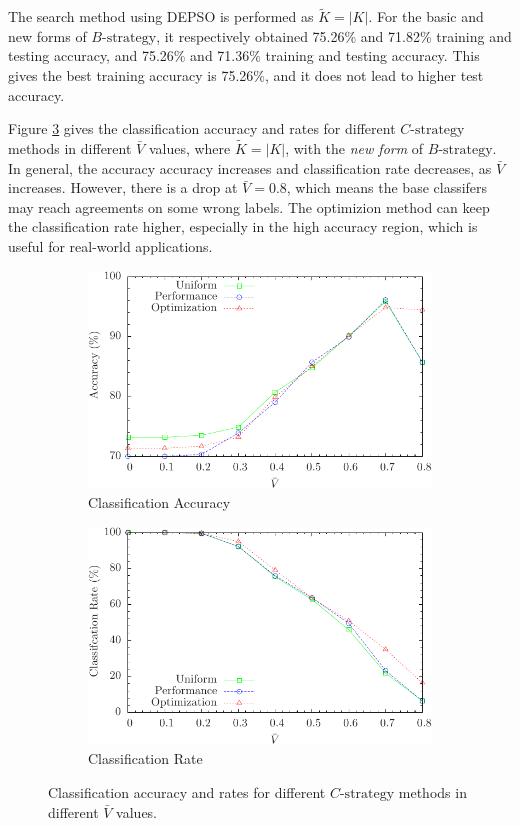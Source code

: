 The search method using DEPSO is performed as $\tilde{K}=|K|$. For the basic and new forms of $B\text{-strategy}$, it respectively obtained 75.26\% and 71.82\% training and testing accuracy, and 75.26\% and 71.36\% training and testing accuracy. This gives the best training accuracy is 75.26\%, and it does not lead to higher test accuracy.

Figure \ref{fig:threshoulds} gives the classification accuracy and rates for different $C\text{-strategy}$ methods in different $\bar{V}$ values, where $\tilde{K}=|K|$, with the \emph{new form} of $B\text{-strategy}$. In general, the accuracy accuracy increases and classification rate decreases, as $\bar{V}$ increases. However, there is a drop at $\bar{V}=0.8$, which means the base classifers may reach agreements on some wrong labels. The optimizion method can keep the classification rate higher, especially in the high accuracy region, which is useful for real-world applications.

\begin{figure} [ht]
\centering
\begin{subfigure}{.45\textwidth}
  \centering
  \includegraphics[width=.95\linewidth]{../Figure/threshould_accuracy}
  \caption{Classification Accuracy}
  \label{fig:threshould_accuracy}
\end{subfigure}%
\begin{subfigure}{.45\textwidth}
  \centering
  \includegraphics[width=.95\linewidth]{../Figure/threshould_rate}
  \caption{Classification Rate}
  \label{fig:threshould_rate}
\end{subfigure}
\caption{Classification accuracy and rates for different $C\text{-strategy}$ methods in different $\bar{V}$ values.}
\label{fig:threshoulds}
\end{figure}

